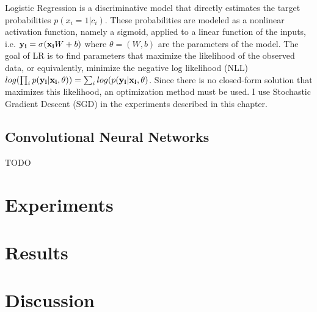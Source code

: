 Logistic Regression is a discriminative model that directly estimates the target probabilities $p(x_i = 1 | c_i)$. These probabilities are modeled as a nonlinear activation function, namely a sigmoid, applied to a linear function of the inputs, i.e. $\bold{y_i} = \sigma(\bold{x_i}W + b)$ where $\theta = (W, b)$ are the parameters of the model. The goal of LR is to find parameters that maximize the likelihood of the observed data, or equivalently, minimize the negative log likelihood (NLL) $log(\prod_i p(\bold{y_i} | \bold{x_i}, \theta)) = \sum_i log(p(\bold{y_i} | \bold{x_i}, \theta)$. Since there is no closed-form solution that maximizes this likelihood, an optimization method must be used. I use Stochastic Gradient Descent (SGD) in the experiments described in this chapter. 

\subsection{Convolutional Neural Networks}

TODO

\section{Experiments}

\section{Results}

\section{Discussion}
